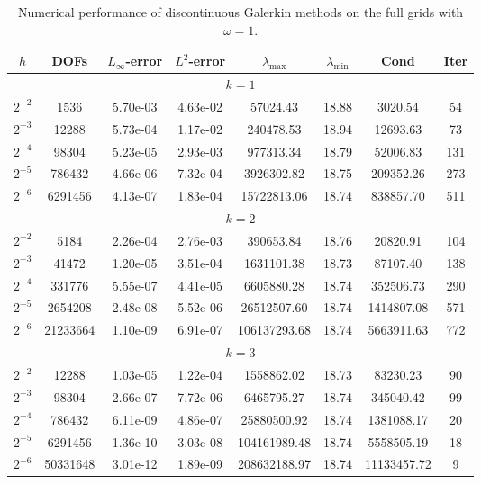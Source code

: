 \documentclass[final,leqno]{siamltex704}
\begin{document}
\begin{table}
\caption{Numerical performance of discontinuous Galerkin methods on the full grids with $\omega=1.$}
\begin{tabular}{cccccccc}\hline\hline
$h$ & DOFs & $L_{\infty}$-error & $L^2$-error & $\lambda_{\max}$ & $\lambda_{\min}$ & Cond & Iter \\ \hline
\multicolumn{8}{c}{$k=1$}\\ \hline
$2^{-2}$   &1536       &5.70e-03   &4.63e-02 &57024.43       &18.88 &3020.54     &54\\
$2^{-3}$   &12288     &5.73e-04   &1.17e-02 &240478.53     &18.94 &12693.63   &73\\
$2^{-4}$   &98304     &5.23e-05   &2.93e-03 &977313.34     &18.79 &52006.83   &131\\
$2^{-5}$   &786432   &4.66e-06   &7.32e-04 &3926302.82   &18.75 &209352.26 &273\\
$2^{-6}$   &6291456 &4.13e-07   &1.83e-04 &15722813.06 &18.74 &838857.70 &511\\ \hline
\multicolumn{8}{c}{$k=2$}\\ \hline
$2^{-2}$   &5184         &2.26e-04   &2.76e-03 &390653.84       &18.76  &20820.91     &104 \\
$2^{-3}$   &41472       &1.20e-05   &3.51e-04 &1631101.38     &18.73  &87107.40     &138\\
$2^{-4}$   &331776     &5.55e-07   &4.41e-05 &6605880.28     &18.74  &352506.73   &290\\
$2^{-5}$   &2654208   &2.48e-08   &5.52e-06 &26512507.60   &18.74  &1414807.08 &571\\
$2^{-6}$   &21233664 &1.10e-09   &6.91e-07 &106137293.68 &18.74 &5663911.63  &772\\ \hline
\multicolumn{8}{c}{$k=3$}\\ \hline
$2^{-2}$ &12288       &1.03e-05   &1.22e-04 &1558862.02     &18.73 &83230.23      &90\\
$2^{-3}$ &98304       &2.66e-07   &7.72e-06 &6465795.27     &18.74 &345040.42    &99\\
$2^{-4}$ &786432     &6.11e-09   &4.86e-07 &25880500.92   &18.74 &1381088.17  &20\\
$2^{-5}$ &6291456   &1.36e-10   &3.03e-08 &104161989.48 &18.74 &5558505.19  &18\\
$2^{-6}$ &50331648 &3.01e-12   &1.89e-09 &208632188.97 &18.74 &11133457.72 &9\\ \hline\hline
\end{tabular}
\end{table}
\end{document}
